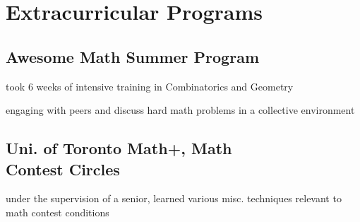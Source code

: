 \section{Extracurricular Programs} 

\subsection{Awesome Math Summer Program}
\sectionsep
\begin{tightemize}
\item took 6 weeks of intensive training in Combinatorics and Geometry
\item engaging with peers and discuss hard math problems in a collective environment
\end{tightemize}
\sectionsep

\subsection{Uni. of Toronto Math+, Math \\ Contest Circles}
\begin{tightemize}
\item under the supervision of a senior, learned various misc. techniques relevant to math contest conditions
\end{tightemize}
\sectionsep
